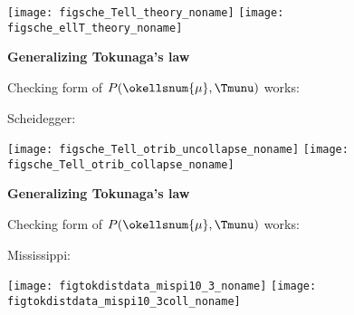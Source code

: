 \begin{frame}[label=]
\begin{frame}[label=]
\begin{frame}[label=]
\begin{frame}[label=]
\begin{frame}[label=]
\begin{frame}[label=]
\begin{frame}[label=]
\begin{frame}[label=]
\begin{frame}[label=]
\begin{frame}[label=]
\begin{frame}[label=]
\begin{frame}[label=]
\begin{frame}[label=]
\begin{frame}[label=]
\begin{frame}[label=]
\begin{frame}[label=]
\begin{frame}[label=]
\begin{frame}[label=]
\begin{frame}[label=]
\begin{frame}[label=]
\begin{frame}[label=]
\begin{frame}[label=]
\begin{frame}[label=]
\begin{frame}[label=]
\begin{frame}[label=]
\begin{frame}[label=]
\begin{frame}[label=]
\begin{frame}[label=]
\begin{frame}[label=]
\begin{frame}[label=]
\begin{frame}[label=]
\begin{frame}[label=]
\begin{frame}[label=]
\begin{frame}[label=]
\begin{frame}[label=]
\begin{frame}[label=]
\begin{frame}[label=]
\begin{frame}[label=]
\begin{frame}[label=]
\begin{frame}[label=]
\begin{frame}[label=]
\begin{frame}[label=]
\begin{frame}[label=]
\begin{frame}[label=]
\begin{frame}[label=]
\begin{frame}[label=]
\begin{frame}[label=]
\begin{frame}[label=]
\begin{frame}[label=]
\begin{frame}[label=]
\begin{frame}[label=]
\begin{frame}[label=]
\begin{frame}[label=]
\begin{frame}[label=]
\begin{frame}[label=]
\begin{frame}[label=]
\begin{frame}[label=]
\begin{frame}[label=]
    \texttt{[image: figsche\_Tell\_theory\_noname]}
    \texttt{[image: figsche\_ellT\_theory\_noname]} 


\begin{frame}[label=]
  \textbf{Generalizing Tokunaga's law}

  
   Checking form of $P(\okellsnum{\mu},\Tmunu)$ works:
  

  Scheidegger:

      \texttt{[image: figsche\_Tell\_otrib\_uncollapse\_noname]}
      \texttt{[image: figsche\_Tell\_otrib\_collapse\_noname]}


\begin{frame}[label=]
  \textbf{Generalizing Tokunaga's law}

  
   Checking form of $P(\okellsnum{\mu},\Tmunu)$ works:
  

  Mississippi:
  
      \texttt{[image: figtokdistdata\_mispi10\_3\_noname]}
      \texttt{[image: figtokdistdata\_mispi10\_3coll\_noname]}





\end{frame}
\end{frame}
\end{frame}
\end{frame}
\end{frame}
\end{frame}
\end{frame}
\end{frame}
\end{frame}
\end{frame}
\end{frame}
\end{frame}
\end{frame}
\end{frame}
\end{frame}
\end{frame}
\end{frame}
\end{frame}
\end{frame}
\end{frame}
\end{frame}
\end{frame}
\end{frame}
\end{frame}
\end{frame}
\end{frame}
\end{frame}
\end{frame}
\end{frame}
\end{frame}
\end{frame}
\end{frame}
\end{frame}
\end{frame}
\end{frame}
\end{frame}
\end{frame}
\end{frame}
\end{frame}
\end{frame}
\end{frame}
\end{frame}
\end{frame}
\end{frame}
\end{frame}
\end{frame}
\end{frame}
\end{frame}
\end{frame}
\end{frame}
\end{frame}
\end{frame}
\end{frame}
\end{frame}
\end{frame}
\end{frame}
\end{frame}
\end{frame}
\end{frame}
\end{frame}
